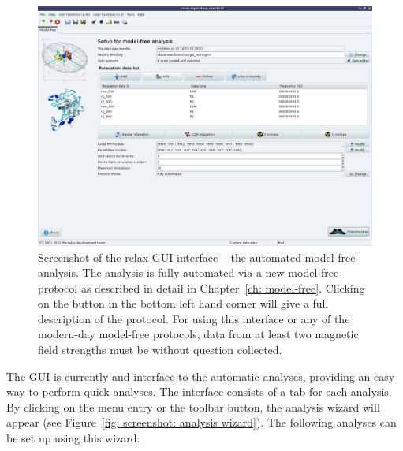 \begin{figure}
\centerline{\includegraphics[width=\textwidth, bb=14 14 1065 768]{graphics/screenshots/analysis_mf}}
\caption[GUI screenshot -- Model-free analysis]{Screenshot of the relax GUI interface -- the automated model-free analysis.  The analysis is fully automated via a new model-free protocol as described in detail in Chapter~\ref{ch: model-free}.  Clicking on the  button in the bottom left hand corner will give a full description of the protocol.  For using this interface or any of the modern-day model-free protocols, data from at least two magnetic field strengths must be without question collected.}\label{fig: screenshot: model-free analysis}
\end{figure}

The GUI is currently and interface to the automatic analyses, providing an easy way to perform quick analyses.  The interface consists of a tab for each analysis.  By clicking on the  menu entry or the  toolbar button, the analysis wizard will appear (see Figure~\ref{fig: screenshot: analysis wizard}).  The following analyses can be set up using this wizard:

